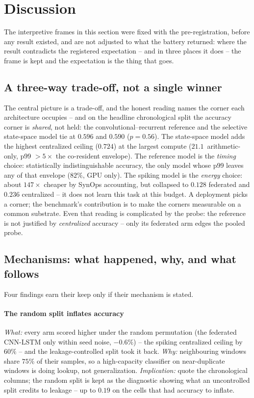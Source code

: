 \section{Discussion}
\label{sec:discussion}

The interpretive frames in this section were fixed with the
pre-registration, before any result existed, and are not adjusted to what
the battery returned: where the result contradicts the registered
expectation -- and in three places it does -- the frame is kept and the
expectation is the thing that goes.

\subsection{A three-way trade-off, not a single winner}

The central picture is a trade-off, and the honest reading names the
corner each architecture occupies -- and on the headline chronological
split the accuracy corner is \emph{shared}, not held: the
convolutional--recurrent reference and the selective state-space model
tie at \macroF{} $0.596$ and $0.590$ ($p=0.56$). The state-space model
adds the highest centralized ceiling ($0.724$) at the largest compute
($21.1$\,\uJ{} arithmetic-only, p99 $>5\times$ the co-resident envelope).
The reference model is the \emph{timing} choice: statistically
indistinguishable accuracy, the only model whose p99 leaves any of that
envelope ($82\%$, GPU only). The spiking model is the \emph{energy}
choice: about $147\times$ cheaper by SynOps accounting, but collapsed to
$0.128$ federated and $0.236$ centralized -- it does not learn this task
at this budget. A deployment picks a corner; the benchmark's
contribution is to make the corners measurable on a common substrate.
Even that reading is complicated by the probe: the reference is not
justified by \emph{centralized} accuracy -- only its federated arm edges
the pooled probe.

\subsection{Mechanisms: what happened, why, and what follows}
\label{sec:mechanisms}

Four findings earn their keep only if their mechanism is stated.

\paragraph{The random split inflates accuracy}
\emph{What:} every arm scored higher under the random permutation
(the federated CNN-LSTM only within seed noise, $-0.6\%$) -- the spiking
centralized ceiling by $60\%$ -- and the
leakage-controlled split took it back. \emph{Why:} neighbouring windows
share $75\%$ of their samples, so a high-capacity classifier on
near-duplicate windows is doing lookup, not generalization.
\emph{Implication:} quote the chronological columns; the random split is
kept as the diagnostic showing what an uncontrolled split credits to
leakage -- up to $0.19$ \macroF{} on the cells that had accuracy to
inflate.

